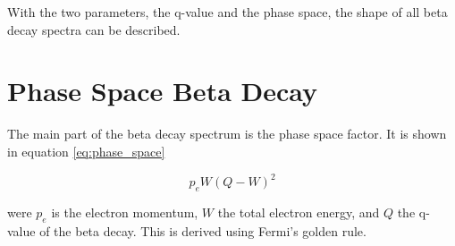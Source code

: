 With the two parameters, the q-value and the phase space, the shape of all beta decay spectra can be described.

\section{Phase Space Beta Decay}
The main part of the beta decay spectrum is the phase space factor.
It is shown in equation \ref{eq:phase_space}

\begin{equation}
	p_{e}W(Q - W)^{2}
	\label{eq:phase_space}
\end{equation}

were $p_{e}$ is the electron momentum, $W$ the total electron energy, and $Q$ the q-value of the beta decay.
This is derived using Fermi's golden rule. 
